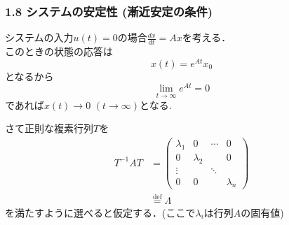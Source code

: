 \documentclass[10pt]{beamer}
\begin{document}
\begin{frame}[t]
\frametitle{1.8 システムの安定性 (漸近安定の条件)}

システムの入力$u(t)=0$の場合$\frac{dx}{dt} = Ax$を考える．\\
このときの状態の応答は
\begin{equation}
 x(t) = e^{At} x_0
\end{equation}
となるから
\begin{equation}
 \lim_{t \rightarrow \infty} e^{At} = 0
\end{equation}
であれば$x(t) \rightarrow 0$ $(t \rightarrow \infty)$となる.

さて正則な複素行列$T$を
\begin{align}
 T^{-1} A T
  &=
  \left(\begin{array}{cccc}
         \lambda_1 & 0         & \cdots & 0 \\
   0         & \lambda_2 &        & 0 \\
   \vdots    &           & \ddots & \\
   0         & 0         &        & \lambda_n
  \end{array}\right) \nonumber \\
 &\stackrel{\text{def}}{=} \Lambda
\end{align}
を満たすように選べると仮定する．(ここで$\lambda_i$は行列$A$の固有値)
\end{frame}
\end{document}

